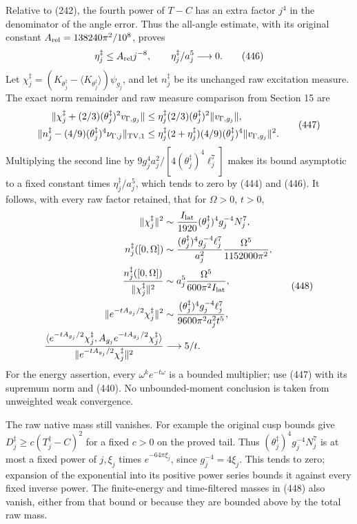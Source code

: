 \documentclass[
  11pt,
]{article}
\begin{document}
Relative to (242), the fourth power of \(T-C\) has an extra factor
\(j^4\) in the denominator of the angle error. Thus the all-angle
estimate, with its original constant \(A_{\rm rel}=138240\pi^2/10^8\),
proves \[
 \eta_j^\ddagger\le A_{\rm rel}j^{-8},
                  \qquad \eta_j^\ddagger/a_j^5\longrightarrow0 .
 \tag{446}
\] Let
\(\chi_j^\ddagger=(K_{\theta_j^\ddagger}-\langle K_{\theta_j^\ddagger}\rangle)\psi_{g_j}\),
and let \(n_j^\ddagger\) be its unchanged raw excitation measure. The
exact norm remainder and raw measure comparison from Section 15 are \[
 \begin{split}
 \|\chi_j^\ddagger+(2/3)(\theta_j^\ddagger)^2v_{\Gamma,g_j}\|
  &\le\eta_j^\ddagger(2/3)(\theta_j^\ddagger)^2
                    \|v_{\Gamma,g_j}\|,\\
 \|n_j^\ddagger-(4/9)(\theta_j^\ddagger)^4\nu_{\Gamma,j}\|_{\rm TV,1}
  &\le\eta_j^\ddagger(2+\eta_j^\ddagger)
          (4/9)(\theta_j^\ddagger)^4\|v_{\Gamma,g_j}\|^2 .
 \end{split}\tag{447}
\] Multiplying the second line by
\(9g_j^4a_j^2/[4(\theta_j^\ddagger)^4\ell_j^7]\) makes its bound
asymptotic to a fixed constant times \(\eta_j^\ddagger/a_j^5\), which
tends to zero by (444) and (446). It follows, with every raw factor
retained, that for \(\Omega>0\), \(t>0\), \[
 \begin{split}
 \|\chi_j^\ddagger\|^2
    &\sim\frac{I_{\rm lat}}{1920}
       (\theta_j^\ddagger)^4g_j^{-4}N_j^7,\\
 n_j^\ddagger([0,\Omega])
    &\sim\frac{(\theta_j^\ddagger)^4g_j^{-4}\ell_j^7}{a_j^2}
                                      \frac{\Omega^5}{1152000\pi^2},\\
 \frac{n_j^\ddagger([0,\Omega])}{\|\chi_j^\ddagger\|^2}
    &\sim a_j^5\frac{\Omega^5}{600\pi^2I_{\rm lat}},\\
 \|e^{-tA_{g_j}/2}\chi_j^\ddagger\|^2
    &\sim
      \frac{(\theta_j^\ddagger)^4g_j^{-4}\ell_j^7}
                       {9600\pi^2a_j^2t^5},\\
 \frac{\langle e^{-tA_{g_j}/2}\chi_j^\ddagger,
          A_{g_j}e^{-tA_{g_j}/2}\chi_j^\ddagger\rangle}
             {\|e^{-tA_{g_j}/2}\chi_j^\ddagger\|^2}
    &\longrightarrow 5/t .
 \end{split}\tag{448}
\] For the energy assertion, every \(\omega^ke^{-t\omega}\) is a bounded
multiplier; use (447) with its supremum norm and (440). No
unbounded-moment conclusion is taken from unweighted weak convergence.

The raw native mass still vanishes. For example the original cusp bounds
give \(D_j^\ddagger\ge c(T_j^\ddagger-C)^2\) for a fixed \(c>0\) on the
proved tail. Thus \((\theta_j^\ddagger)^4g_j^{-4}N_j^7\) is at most a
fixed power of \(j,\xi_j\) times \(e^{-64\pi\xi_j}\), since
\(g_j^{-4}=4\xi_j\). This tends to zero; expansion of the exponential
into its positive power series bounds it against every fixed inverse
power. The finite-energy and time-filtered masses in (448) also vanish,
either from that bound or because they are bounded above by the total
raw mass.
\end{document}
